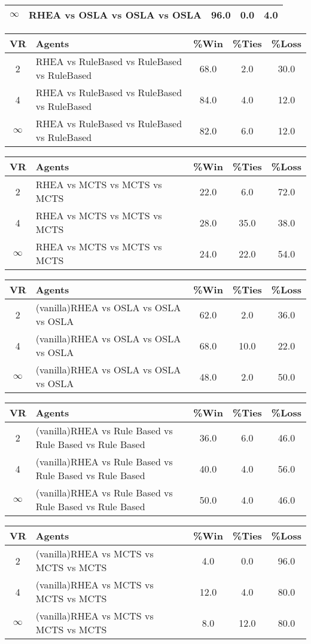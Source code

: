 \documentclass{report}
\begin{document}
\begin{center}
\begin{tabularx}{400pt}{|c|X|c|c|c|}
	\hline
	$\infty$  & RHEA vs OSLA vs OSLA vs OSLA & 96.0&0.0 &4.0 \\
	\hline
\end{tabularx}
\begin{tabularx}{400pt}{|c|X|c|c|c|}
	\hline
	VR& Agents & \%Win & \%Ties & \%Loss\\
	\hline
	2 & RHEA vs RuleBased vs RuleBased vs RuleBased & 68.0&2.0 &30.0 \\
	\hline
	4&RHEA vs RuleBased vs RuleBased vs RuleBased  & 84.0&4.0 &12.0 \\
	\hline
	$\infty$ &RHEA vs RuleBased vs RuleBased vs RuleBased  & 82.0&6.0 &12.0 \\
	\hline
\end{tabularx} 
\begin{tabularx}{400pt}{|c|X|c|c|c|}
	\hline
	VR& Agents & \%Win & \%Ties & \%Loss\\
	\hline
	2 & RHEA vs MCTS vs MCTS vs MCTS & 22.0&6.0 &72.0 \\
	\hline
	4&RHEA vs MCTS vs MCTS vs MCTS & 28.0&35.0 &38.0 \\
	\hline
	$\infty$ &RHEA vs MCTS vs MCTS vs MCTS & 24.0&22.0 &54.0 \\
	\hline
\end{tabularx} 
\begin{tabularx}{400pt}{|c|X|c|c|c|}
	\hline
	VR& Agents & \%Win & \%Ties & \%Loss\\
	\hline
	2 & (vanilla)RHEA vs OSLA vs OSLA vs OSLA & 62.0&2.0 &36.0 \\
	\hline
	4& (vanilla)RHEA vs OSLA vs OSLA vs OSLA  & 68.0&10.0 &22.0 \\
	\hline
	$\infty$ & (vanilla)RHEA vs OSLA vs OSLA vs OSLA & 48.0&2.0 &50.0 \\
	\hline
\end{tabularx} 
\begin{tabularx}{400pt}{|c|X|c|c|c|}
	\hline
	VR& Agents & \%Win & \%Ties & \%Loss\\
	\hline
	2 & (vanilla)RHEA vs Rule Based vs Rule Based vs Rule Based & 36.0&6.0 &46.0 \\
	\hline
	4& (vanilla)RHEA vs Rule Based vs Rule Based vs Rule Based  & 40.0&4.0 &56.0 \\
	\hline
	$\infty$ & (vanilla)RHEA vs Rule Based vs Rule Based vs Rule Based & 50.0&4.0 &46.0 \\
	\hline
\end{tabularx} 
\begin{tabularx}{400pt}{|c|X|c|c|c|}
	\hline
	VR& Agents & \%Win & \%Ties & \%Loss\\
	\hline
	2 & (vanilla)RHEA vs MCTS vs MCTS vs MCTS & 4.0&0.0 &96.0 \\
	\hline
	4& (vanilla)RHEA vs MCTS vs MCTS vs MCTS  & 12.0&4.0 &80.0 \\
	\hline
	$\infty$ & (vanilla)RHEA vs MCTS vs MCTS vs MCTS & 8.0&12.0 &80.0 \\
	\hline
\end{tabularx} 
\end{center}
\end{document}
